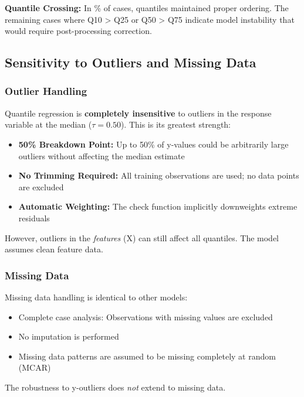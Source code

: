 \textbf{Quantile Crossing:}
In \ModelSevenQuantileMonotonicity\% of cases, quantiles maintained proper ordering. The remaining cases where Q10 > Q25 or Q50 > Q75 indicate model instability that would require post-processing correction.

\subsection{Sensitivity to Outliers and Missing Data}

\subsubsection{Outlier Handling}

Quantile regression is \textbf{completely insensitive} to outliers in the response variable at the median ($\tau = 0.50$). This is its greatest strength:

\begin{itemize}
\item \textbf{50\% Breakdown Point:} Up to 50\% of y-values could be arbitrarily large outliers without affecting the median estimate
\item \textbf{No Trimming Required:} All \ModelSevenTrainingSamples{} training observations are used; no data points are excluded
\item \textbf{Automatic Weighting:} The check function implicitly downweights extreme residuals
\end{itemize}

However, outliers in the \textit{features} (X) can still affect all quantiles. The model assumes clean feature data.

\subsubsection{Missing Data}

Missing data handling is identical to other models:
\begin{itemize}
\item Complete case analysis: Observations with missing values are excluded
\item No imputation is performed
\item Missing data patterns are assumed to be missing completely at random (MCAR)
\end{itemize}

The robustness to y-outliers does \textit{not} extend to missing data.

